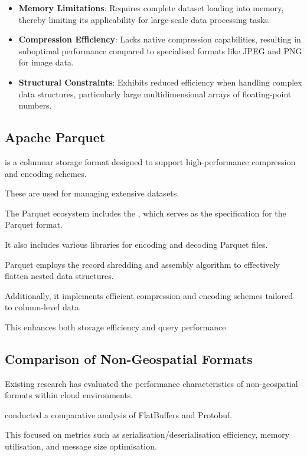 \begin{itemize}
  \item \textbf{Memory Limitations}: Requires complete dataset loading into memory, thereby limiting its applicability for large-scale data processing tasks.
  \item \textbf{Compression Efficiency}: Lacks native compression capabilities, resulting in suboptimal performance compared to specialised formats like JPEG and PNG for image data.
  \item \textbf{Structural Constraints}: Exhibits reduced efficiency when handling complex data structures, particularly large multidimensional arrays of floating-point numbers.
\end{itemize}

\subsection{Apache Parquet}
\label{rw:non_geospatial_formats:parquet}

\citet{parquet} is a columnar storage format designed to support high-performance compression and encoding schemes.

These are used for managing extensive datasets.

The Parquet ecosystem includes the \citet{parquet-format}, which serves as the specification for the Parquet format.

It also includes various libraries for encoding and decoding Parquet files.

Parquet employs the record shredding and assembly algorithm \citep{dremel_2010} to effectively flatten nested data structures.

Additionally, it implements efficient compression and encoding schemes tailored to column-level data.

This enhances both storage efficiency and query performance.

\subsection{Comparison of Non-Geospatial Formats}
\label{rw:non_geospatial_formats:comparison}

Existing research has evaluated the performance characteristics of non-geospatial formats within cloud environments.

\citet{daniel_persson_2020} conducted a comparative analysis of FlatBuffers and Protobuf.

This focused on metrics such as serialisation/deserialisation efficiency, memory utilisation, and message size optimisation.

